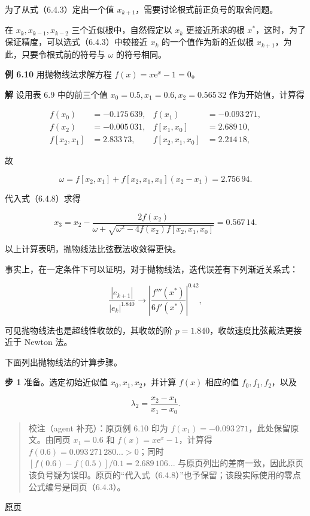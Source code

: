 \documentclass[
  10pt,
  fontset=fandol]{ctexart}
\begin{document}
为了从式（6.4.3）定出一个值 \(x_{k+1}\)，需要讨论根式前正负号的取舍问题。

在 \(x_k,x_{k-1},x_{k-2}\) 三个近似根中，自然假定以 \(x_k\) 更接近所求的根 \(x^*\)，这时，为了保证精度，可以选式（6.4.3）中较接近 \(x_k\) 的一个值作为新的近似根 \(x_{k+1}\)，为此，只要令根式前的符号与 \(\omega\) 的符号相同。

\textbf{例 6.10} 用抛物线法求解方程 \(f(x)=x\mathrm{e}^x-1=0\)。

\textbf{解} 设用表 6.9 中的前三个值 \(x_0=0.5,x_1=0.6,x_2=0.565\,32\) 作为开始值，计算得

\[
\begin{aligned}
f(x_0)&=-0.175\,639,& f(x_1)&=-0.093\,271,\\
f(x_2)&=-0.005\,031,& f[x_1,x_0]&=2.689\,10,\\
f[x_2,x_1]&=2.833\,73,& f[x_2,x_1,x_0]&=2.214\,18,
\end{aligned}
\]

故

\[
\omega=f[x_2,x_1]+f[x_2,x_1,x_0](x_2-x_1)=2.756\,94.
\]

代入式（6.4.8）求得

\[
x_3=x_2-\frac{2f(x_2)}{\omega+\sqrt{\omega^2-4f(x_2)f[x_2,x_1,x_0]}}=0.567\,14.
\]

以上计算表明，抛物线法比弦截法收敛得更快。

事实上，在一定条件下可以证明，对于抛物线法，迭代误差有下列渐近关系式：

\[
\frac{|e_{k+1}|}{|e_k|^{1.840}}\to\left|\frac{f'''(x^*)}{6f'(x^*)}\right|^{0.42},
\]

可见抛物线法也是超线性收敛的，其收敛的阶 \(p=1.840\)，收敛速度比弦截法更接近于 Newton 法。

下面列出抛物线法的计算步骤。

\textbf{步 1} 准备。选定初始近似值 \(x_0,x_1,x_2\)，并计算 \(f(x)\) 相应的值 \(f_0,f_1,f_2\)，以及

\[
\lambda_2=\frac{x_2-x_1}{x_1-x_0}.
\]

\begin{quote}
校注（agent 补充）：原页例 6.10 印为 \(f(x_1)=-0.093\,271\)，此处保留原文。由同页 \(x_1=0.6\) 和 \(f(x)=x\mathrm{e}^x-1\)，计算得 \(f(0.6)=0.093\,271\,280\ldots>0\)；同时 \([f(0.6)-f(0.5)]/0.1=2.689\,106\ldots\) 与原页列出的差商一致，因此原页该负号疑为误印。原页的``代入式（6.4.8）''也予保留；该段实际使用的零点公式编号是同页（6.4.3）。
\end{quote}

\href{../../source-images/pdf-171.jpeg}{原页}
\end{document}
